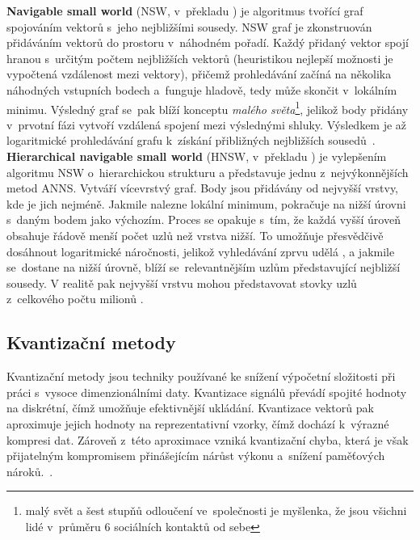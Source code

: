 \textbf{Navigable small world} (NSW, v~překladu ) je algoritmus tvořící graf spojováním vektorů s~jeho nejbližšími sousedy. NSW graf je zkonstruován přidáváním vektorů do prostoru v~náhodném pořadí. Každý přidaný vektor spojí hranou s~určitým počtem nejbližších vektorů (heuristikou nejlepší možnosti je vypočtená vzdálenost mezi vektory), přičemž prohledávání začíná na několika náhodných vstupních bodech a~funguje hladově, tedy může skončit v~lokálním minimu. Výsledný graf se~pak blíží konceptu \textit{malého světa}\footnote{malý svět a šest stupňů odloučení ve~společnosti je myšlenka, že jsou všichni lidé v~průměru 6 sociálních kontaktů od sebe}, jelikož body přidány v~prvotní fázi vytvoří vzdálená spojení mezi výslednými shluky. Výsledkem je až logaritmické prohledávání grafu k~získání přibližných nejbližších sousedů~\cite{malkov2016_hnsw}. \\

\textbf{Hierarchical navigable small world} (HNSW, v~překladu ) je vylepšením algoritmu NSW o~hierarchickou strukturu a představuje jednu z~nejvýkonnějších metod ANNS. Vytváří vícevrstvý graf. Body jsou přidávány od nejvyšší vrstvy, kde je jich nejméně. Jakmile nalezne lokální minimum, pokračuje na nižší úrovni s~daným bodem jako výchozím. Proces se opakuje s~tím, že každá vyšší úroveň obsahuje řádově menší počet uzlů než vrstva nižší. To umožňuje přesvědčivě dosáhnout logaritmické náročnosti, jelikož vyhledávání zprvu udělá , a jakmile se~dostane na nižší úrovně, blíží se~relevantnějším uzlům představující nejbližší sousedy. V realitě pak nejvyšší vrstvu mohou představovat stovky uzlů z~celkového počtu milionů \cite{malkov2016_hnsw}. \\

\subsection{Kvantizační metody}
Kvantizační metody jsou techniky používané ke snížení výpočetní složitosti při práci s~vysoce dimenzionálními daty. Kvantizace signálů převádí spojité hodnoty na diskrétní, čímž umožňuje efektivnější ukládání. Kvantizace vektorů pak aproximuje jejich hodnoty na reprezentativní vzorky, čímž dochází k~výrazné kompresi dat. Zároveň z~této aproximace vzniká kvantizační chyba, která je však přijatelným kompromisem přinášejícím nárůst výkonu a~snížení paměťových nároků.~\cite{jegou2011_product_quantization}. \\

